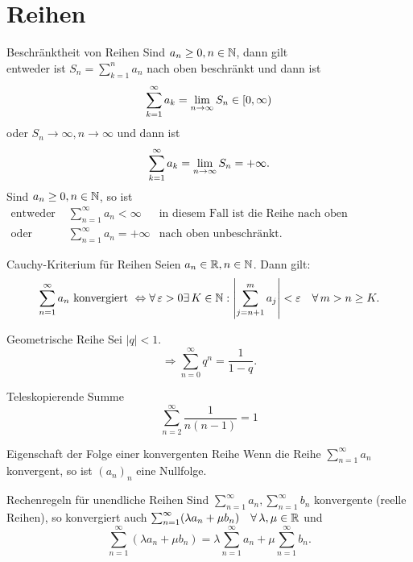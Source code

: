 \documentclass[main.tex]{subfiles}
\begin{document}
\section*{Reihen}
\begin{karte}{Beschränktheit von Reihen}
    Sind \(a_n \geq 0, n\in\mathbb{N} \), dann gilt\\
    entweder ist \(S_n = \sum_{k=1}^{n}a_n\) 
    nach oben beschränkt und dann ist 
    \[ \sum_{k=1}^{\infty}a_k = \lim\limits_{n\rightarrow\infty} 
    S_n \in [0,\infty) \]
    oder \(S_n \rightarrow \infty, 
    n\rightarrow\infty \) und dann 
    ist \[ \sum_{k=1}^{\infty}a_k 
    = \lim\limits_{n\rightarrow\infty}S_n = +\infty. \]
    Sind \(a_n \geq 0, n\in \mathbb{N} \), so ist
	\begin{align*}
        \text{entweder } 
        &\sum_{n=1}^{\infty}a_n < \infty 
        &\text{in diesem Fall ist die 
        Reihe nach oben beschränkt.}\\
        \text{oder } &\sum_{n=1}^{\infty}
        a_n = +\infty &\text{nach oben 
        unbeschränkt.}
	\end{align*}
\end{karte}
\begin{karte}{Cauchy-Kriterium für Reihen}
    Seien \(a_n \in\mathbb{R}, n\in\mathbb{N} \). Dann gilt: 
    \[ \sum_{n=1}^{\infty} a_n 
    \text{ konvergiert } \Leftrightarrow 
    \forall \varepsilon > 0 \exists 
    K \in \N : \abs{\sum_{j=n+1}^{m}a_j} 
    < \varepsilon \quad \forall m>n\geq K.\]
\end{karte}
\begin{karte}{Geometrische Reihe}
    Sei \(|q|<1\).
    \[ \Rightarrow \sum_{n=0}^{\infty} q^n 
    = \frac{1}{1-q}. \]
\end{karte}
\begin{karte}{Teleskopierende Summe}
    \[\sum_{n=2}^{\infty}\frac{1}{n(n-1)}=1 \]
\end{karte}
\begin{karte}{Eigenschaft der Folge einer konvergenten Reihe}
    Wenn die Reihe \(\sum_{n=1}^{\infty} 
    a_n\) konvergent, so ist \({(a_n)}_n\) 
    eine Nullfolge.
\end{karte}
\begin{karte}{Rechenregeln für unendliche Reihen}
    Sind \( \sum_{n=1}^{\infty}a_n, 
    \sum_{n=1}^{\infty}b_n \) konvergente 
    (reelle Reihen), so konvergiert auch 
    \( \sum_{n=1}^{\infty}(\lambda a_n 
    + \mu b_n) \quad \forall \lambda, 
    \mu \in\R \) und 
    \[ \sum_{n=1}^{\infty} 
    (\lambda a_n + \mu b_n) = \lambda 
    \sum_{n=1}^{\infty}a_n + \mu 
    \sum_{n=1}^{\infty}b_n. \]
\end{karte}
\end{document}
